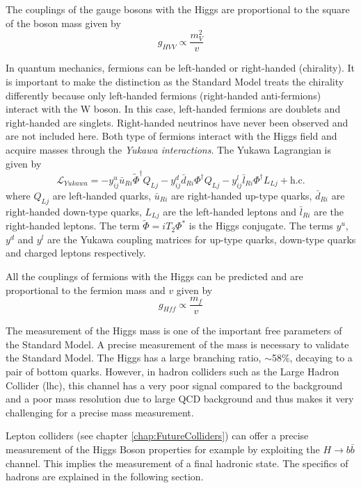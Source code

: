 The couplings of the gauge bosons with the Higgs are proportional to the square of the boson mass given by
\begin{equation}
  g_{HVV} \propto \frac{m_V^2}{v}
\end{equation}

In quantum mechanics, fermions can be left-handed or right-handed (chirality). It is important to make the distinction as the Standard Model treats the chirality differently because only left-handed fermions (right-handed anti-fermions) interact with the W boson. In this case, left-handed fermions are doublets and right-handed are singlets. Right-handed neutrinos have never been observed and are not included here. Both type of fermions interact with the Higgs field and acquire masses through the \textit{Yukawa interactions}. The Yukawa Lagrangian is given by \cite{ILC_TDR_Vol2}
\begin{equation}
  \mathcal{L}_{Yukawa} = - y^u_{ij}\bar{u}_{Ri}\widetilde{\Phi}^{\dagger}Q_{Lj} - y^d_{ij}\bar{d}_{Ri}\Phi^{\dagger}Q_{Lj} - y^l_{ij}\bar{l}_{Ri}\Phi^{\dagger}L_{Lj} + \text{h.c}.
\end{equation}
where $Q_{Lj}$ are left-handed quarks, $\bar{u}_{Ri}$ are right-handed up-type quarks, $\bar{d}_{Ri}$ are right-handed down-type quarks, $L_{Lj}$ are the left-handed leptons and $\bar{l}_{Ri}$ are the right-handed leptons. The term $\widetilde{\Phi} = iT_2\Phi^{*}$ is the Higgs conjugate. The terms $y^u$, $y^d$ and $y^l$ are the Yukawa coupling matrices for up-type quarks, down-type quarks and charged leptons respectively.

All the couplings of fermions with the Higgs can be predicted and are proportional to the fermion mass and $v$ given by
\begin{equation}
  g_{Hff} \propto \frac{m_f}{v}
\end{equation}

The measurement of the Higgs mass is one of the important free parameters of the Standard Model. A precise measurement of the mass is necessary to validate the Standard Model. The Higgs has a large branching ratio, $\sim$58\%, decaying to a pair of bottom quarks. However, in hadron colliders such as the Large Hadron Collider (\acrshort{lhc}), this channel has a very poor signal compared to the background and a poor mass resolution due to large QCD background and thus makes it very challenging for a precise mass measurement.

Lepton colliders (see chapter \ref{chap:FutureColliders}) can offer a precise measurement of the Higgs Boson properties for example by exploiting the $H \rightarrow b\bar{b}$ channel. This implies the measurement of a final hadronic state. The specifics of hadrons are explained in the following section.

